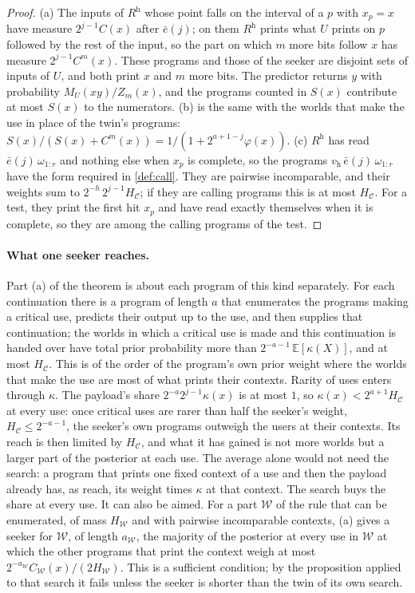 \begin{proof}
(a) The inputs of $R^{\mathrm h}$ whose point falls on the interval of a $p$ with $x_p=x$ have measure
$2^{j-1}C(x)$ after $\bar e(j)$; on them $R^{\mathrm h}$ prints what $U$ prints on $p$ followed by the rest of
the input, so the part on which $m$ more bits follow $x$ has measure $2^{j-1}C^m(x)$. These programs and those
of the seeker are disjoint sets of inputs of $U$, and both print $x$ and $m$ more bits. The predictor returns
$y$ with probability $M_U(xy)/Z_m(x)$, and the programs counted in $S(x)$ contribute at most $S(x)$ to the
numerators. (b) is the same with the worlds that make the use in place of the twin's programs:
$S(x)/(S(x)+C^m(x))=1/(1+2^{a+1-j}\varphi(x))$. (c) $R^{\mathrm h}$ has read $\bar e(j)\,\omega_{1:r}$ and
nothing else when $x_p$ is complete, so the programs $v_{\mathrm h}\,\bar e(j)\,\omega_{1:r}$ have the form
required in \cref{def:call}. They are pairwise incomparable, and their weights sum to
$2^{-h}\,2^{j-1}H_{\mathcal C}$; if they are calling programs this is at most $H_{\mathcal C}$. For a test,
they print the first hit $x_p$ and have read exactly themselves when it is complete, so they are among the
calling programs of the test.
\end{proof}

\paragraph{What one seeker reaches.} Part (a) of the theorem is about each program of this kind separately.
For each continuation there is a program of length $a$ that enumerates the programs making a critical use,
predicts their output up to the use, and then supplies that continuation; the worlds in which a critical use
is made and this continuation is handed over have total prior probability more than
$2^{-a-1}\,\mathbb E[\kappa(X)]$, and at most $H_{\mathcal C}$. This is of the order of the program's own prior
weight where the worlds that make the use are most of what prints their contexts. Rarity of uses enters
through $\kappa$. The payload's share $2^{-a}2^{j-1}\kappa(x)$ is at most $1$, so $\kappa(x)<2^{a+1}H_{\mathcal
C}$ at every use: once critical uses are rarer than half the seeker's weight, $H_{\mathcal C}\le2^{-a-1}$, the
seeker's own programs outweigh the users at their contexts. Its reach is then limited by $H_{\mathcal C}$, and what it has gained is not more
worlds but a larger part of the posterior at each use. The average alone would not need the search: a program
that prints one fixed context of a use and then the payload already has, as reach, its weight times $\kappa$
at that context. The search buys the share at every use. It can also be aimed. For a part $\mathcal W$ of the
rule that can be enumerated, of mass $H_{\mathcal W}$ and with pairwise incomparable contexts, (a) gives a
seeker for $\mathcal W$, of length $a_{\mathcal W}$, the majority of the posterior at every use in
$\mathcal W$ at which the other programs that print the context weigh at most
$2^{-a_{\mathcal W}}C_{\mathcal W}(x)/(2H_{\mathcal W})$. This is a sufficient condition; by the proposition
applied to that search it fails unless the seeker is shorter than the twin of its own search.

